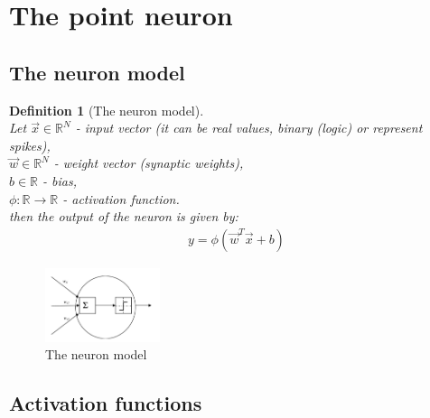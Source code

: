 \documentclass[11pt]{book} %
\newtheorem{definition}{Definition}[section]
\begin{document}
%
%
%


\section{The point neuron}
\subsection{The neuron model}
\begin{definition}[The neuron model]\ \\
    Let $\vec{x} \in \mathbb{R}^N$ - input vector (it can be real values, binary (logic) or represent spikes), \\
    $\vec{w} \in \mathbb{R}^N$ - weight vector (synaptic weights), \\  
    $b \in \mathbb{R}$ - bias, \\
    $\phi : \mathbb{R} \rightarrow \mathbb{R}$ - activation function. \\
    then the output of the neuron is given by:
    \begin{align}
        y = \phi(\vec{w}^T \vec{x} + b)
    \end{align}
\end{definition}

\begin{figure}[ht]
    \centering
    \includegraphics[width=0.3\textwidth]{Figs/point_neuron.jpeg}
    \caption{The neuron model}
    \label{fig:neuron_model}
\end{figure}


\subsection{Activation functions}
\end{document}
